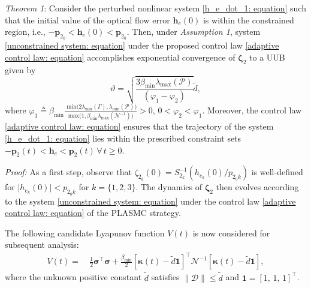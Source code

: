 \documentclass[lettersize,journal]{IEEEtran}
\begin{document}
\textit{Theorem 1}:
Consider the perturbed nonlinear system \eqref{h_e_dot_1: equation} such that the initial value of the optical flow error $\boldsymbol{h}_{e}(0)$ is within the constrained region, i.e., $- \boldsymbol{p}_{2_0} < \boldsymbol{h}_{e}(0) < \boldsymbol{p}_{2_0}$. Then, under \textit{Assumption 1}, system \eqref{unconstrained system: equation} under the proposed control law \eqref{adaptive control law: equation} accomplishes exponential convergence of $\boldsymbol{\zeta}_2$ to a UUB given by
\begin{equation}
    \vartheta = \sqrt{\frac{3 \beta_{\min}\lambda_{\max}(\mathcal{P})}{\left(\varphi_1 - \varphi_2\right)}} \tilde{d},
\end{equation}
where $\varphi_1 \triangleq \beta_{\min} \frac{\text{ min}\big(2 \lambda_{\min}\left(\Gamma \right),\lambda_{\min}\left(\mathcal{P} \right)\big)}{\text{max}\big(1,\beta_{\min} \lambda_{\max}\left(\mathcal{N}^{-1} \right)\big)}>0$, $0<\varphi_2<\varphi_1$.
Moreover, the control law \eqref{adaptive control law: equation} ensures that the trajectory of the system \eqref{h_e_dot_1: equation} lies within the prescribed constraint sets $- \boldsymbol{p}_{2}(t) < \boldsymbol{h}_{e} < \boldsymbol{p}_{2}(t) \, \forall \, t \geq 0$.

\textit{Proof:}
As a first step, observe that $\zeta_{2_k}(0) = S_{2_k}^{-1}(h_{e_k}(0) / p_{2_0 k})$ is well-defined for $\lvert h_{e_k}(0) \rvert < p_{2_0 k}$ for $k = \{1, 2, 3\}$. The dynamics of $\boldsymbol{\zeta}_2$ then evolves according to the system \eqref{unconstrained system: equation} under the control law \eqref{adaptive control law: equation} of the PLASMC strategy.

\noindent The following candidate Lyapunov function $V(t)$ is now considered for subsequent analysis:
\begin{align} \label{Lyapunov function: equation}
    V(t) =&~ \frac{1}{2}\boldsymbol{\sigma}^{\top}\boldsymbol{\sigma} + \frac{\beta_{\min}}{2} \left[\boldsymbol{\kappa}(t) - \tilde{d} \boldsymbol{1}\right]^{\top}  \mathcal{N}^{-1} \left[\boldsymbol{\kappa}(t) - \tilde{d} \boldsymbol{1}\right],
\end{align}
where the unknown positive constant $\tilde{d}$ satisfies $\lVert\mathcal{D}\rVert \leq \tilde{d}$ and $\boldsymbol{1} = [1,\,1,\,1]^{\top}$.
\end{document}
